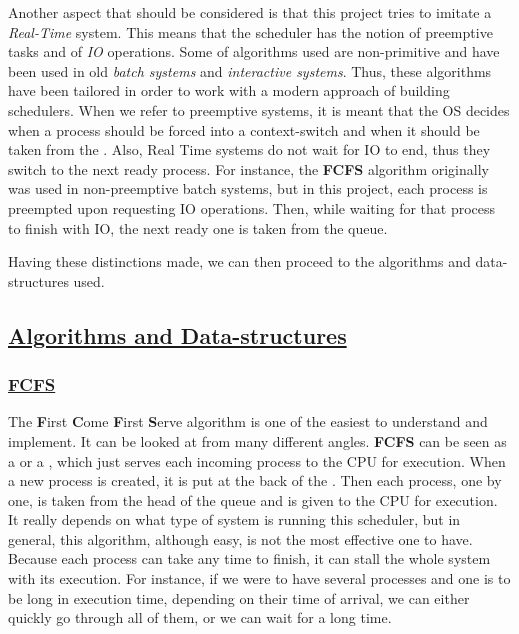\documentclass{article}
\newcommand{\code}[1]{\codeinline{\texttt{#1}}}
\begin{document}
Another aspect that should be considered is that this project tries to imitate a \textit{Real-Time} system. This means that the scheduler has the notion of preemptive tasks and of \textit{IO} operations. Some of algorithms used are non-primitive and have been used in old \textit{batch systems} and \textit{interactive systems}. Thus, these algorithms have been tailored in order to work with a modern approach of building schedulers. When we refer to preemptive systems, it is meant that the OS decides when a process should be forced into a context-switch and when it should be taken from the \code{ready\_queue}. Also, Real Time systems do not wait for IO to end, thus they switch to the next ready process. For instance, the \textbf{FCFS} algorithm originally was used in non-preemptive batch systems, but in this project, each process is preempted upon requesting IO operations. Then, while waiting for that process to finish with IO, the next ready one is taken from the queue.

Having these distinctions made, we can then proceed to the algorithms and data-structures used.

\subsection{\underline{Algorithms and Data-structures}}

\subsubsection{\underline{FCFS}}

The \textbf{F}irst \textbf{C}ome \textbf{F}irst \textbf{S}erve algorithm is one of the easiest to understand and implement. It can be looked at from many different angles. \textbf{FCFS} can be seen as a \code{linked-list} or a \code{queue}, which just serves each incoming process to the CPU for execution. When a new process is created, it is put at the back of the \code{ready\_queue}. Then each process, one by one, is taken from the head of the queue and is given to the CPU for execution. It really depends on what type of system is running this scheduler, but in general, this algorithm, although easy, is not the most effective one to have. Because each process can take any time to finish, it can stall the whole system with its execution. For instance, if we were to have several processes and one is to be long in execution time, depending on their time of arrival, we can either quickly go through all of them, or we can wait for a long time.
\end{document}

